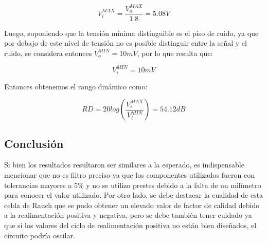 \begin{equation}
    V_i^{MAX} = \frac{V_o^{MAX}}{1.8} = 5.08V
\end{equation}

Luego, suponiendo que la  tensi\'on m\'inima distinguible es el piso de ruido, ya que por debajo de este nivel de tensi\'on no es posible distinguir entre la se\~nal y el ruido, se considera entonces $V_o^{MIN}=10mV$, por lo que resulta que:

\begin{equation}
    V_i^{MIN} = 10mV
\end{equation}

Entonces obtenemos el rango dinámico como:

\begin{equation}
    RD = 20log(\frac{V_i^{MAX}}{V_i^{MIN}})= 54.12dB
\end{equation}

\subsection{Conclusión}

Si bien los resultados resultaron ser similares a la esperado, es indispensable mencionar que no es filtro preciso ya que los componentes utilizados fueron con tolerancias mayores a $5\%$ y no se utilizo prestes debido a la falta de un milímetro para conocer el valor utilizado. Por otro lado, se debe destacar la cualidad de esta celda de Rauch que se pudo obtener un elevado valor de factor de calidad debido a la realimentación positiva y negativa, pero se debe también tener cuidado ya que si los valores del ciclo de realimentación positiva no están bien diseñados, el circuito podría oscilar.
